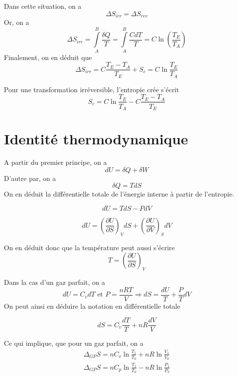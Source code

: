 Dans cette situation, on a 
$$\Delta S_{irr} = \Delta S_{rev}$$
Or, on a
$$\Delta S_{irr}=\int \limits_A^B \frac{\delta Q}{T}=\int \limits_A^B \frac{CdT}{T}=C \ln \left ( \frac{T_E}{T_A} \right )$$
Finalement, on en déduit que
$$\Delta S_{irr}=C \frac{T_E-T_A}{T_E} + S_c = C \ln \frac{T_E}{T_A}$$
\begin{proposition}
Pour une transformation irréversible, l'entropie crée s'écrit
\begin{equation}
S_c = C \ln \frac{T_E}{T_A} - C \frac{T_E-T_A}{T_E}
\end{equation}
\end{proposition}

\section{Identité thermodynamique}

A partir du premier principe, on a 
$$dU=\delta Q+ \delta W$$
D'autre par, on a 
$$\delta Q = TdS$$
On en déduit la différentielle totale de l'énergie interne à partir de l'entropie.
\begin{proposition}
\begin{equation}
dU=TdS -PdV
\end{equation}
\end{proposition}
\begin{proposition}
\begin{equation}
dU=\left ( \frac{\partial U}{\partial S}\right )_V dS + \left ( \frac{\partial U}{\partial V} \right ) _ S dV
\end{equation}
\end{proposition}

On en déduit donc que la température peut aussi s'écrire
\begin{equation}
T=\left ( \frac{\partial U}{\partial S}\right )_V
\end{equation}

Dans la cas d'un gaz parfait, on a 
$$dU = C_v dT \textrm{ et } P=\frac{nRT}{V} \Rightarrow dS=\frac{dU}{T}+\frac{P}{T}dV$$
On peut ainsi en déduire la notation en différentielle totale
\begin{proposition}
\begin{equation}
dS=C_v\frac {dT}{T}+nR\frac{dV}{V}
\end{equation}
\end{proposition}
Ce qui implique, que pour un gaz parfait, on a
\begin{eqnarray}
\Delta_{GP} S = nC_v \ln \frac{T_1}{T_0} + nR \ln \frac{V_1}{V_0}\\
\Delta_{GP} S = nC_p \ln \frac{T_1}{T_0} - nR \ln \frac{P_1}{P_0}
\end{eqnarray}

